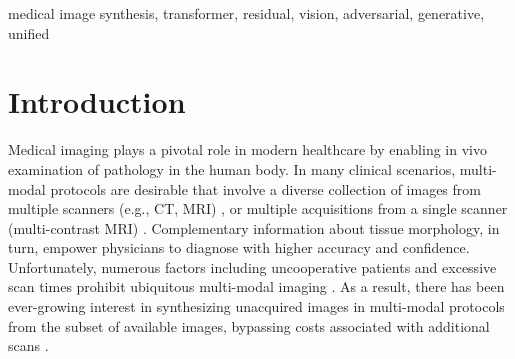 \documentclass[journal,twoside,web]{ieeecolor}
\begin{document}
\begin{IEEEkeywords}
medical image synthesis, transformer, residual, vision, adversarial, generative, unified \vspace{-0.25cm}
\end{IEEEkeywords}

\section{Introduction}
Medical imaging plays a pivotal role in modern healthcare by enabling in vivo examination of pathology in the human body. In many clinical scenarios, multi-modal protocols are desirable that involve a diverse collection of images from multiple scanners (e.g., CT, MRI) \cite{pichler2008}, or multiple acquisitions from a single scanner (multi-contrast MRI) \cite{moraal2008}. Complementary information about tissue morphology, in turn, empower physicians to diagnose with higher accuracy and confidence. Unfortunately, numerous factors including uncooperative patients and excessive scan times prohibit ubiquitous multi-modal imaging \cite{thukral2015,krupa2015}. As a result, there has been ever-growing interest in synthesizing unacquired images in multi-modal protocols from the subset of available images, bypassing costs associated with additional scans \cite{iglesias2013,huo2018}.
\end{document}
